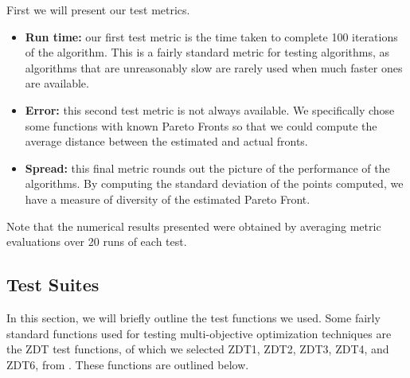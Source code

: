 \documentclass[letterpaper, 10 pt, conference]{ieeeconf}  %
\begin{document}
First we will present our test metrics.

\begin{itemize}
\item \textbf{Run time:} our first test metric is the time taken to complete 100 iterations of the algorithm. This is a fairly standard metric for testing algorithms, as algorithms that are unreasonably slow are rarely used when much faster ones are available.

\item \textbf{Error:} this second test metric is not always available. We specifically chose some functions with known Pareto Fronts so that we could compute the average distance between the estimated and actual fronts. 

\item \textbf{Spread:} this final metric rounds out the picture of the performance of the algorithms. By computing the standard deviation of the points computed, we have a measure of diversity of the estimated Pareto Front.
\end{itemize}

Note that the numerical results presented were obtained by averaging metric evaluations over 20 runs of each test.


\subsection{Test Suites}

In this section, we will briefly outline the test functions we used. Some fairly standard functions used for testing multi-objective optimization techniques are the ZDT test functions, of which we selected ZDT1, ZDT2, ZDT3, ZDT4, and ZDT6, from \cite{ZDTFunsPaper}. These functions are outlined below.
\end{document}
